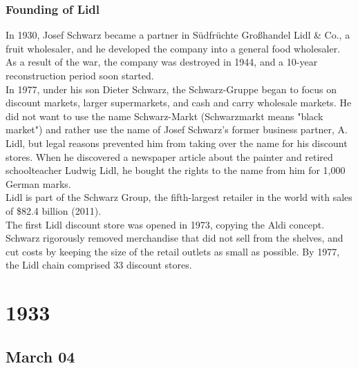 \documentclass[11pt]{report}
\begin{document}
\subsection{Founding of Lidl}
In 1930, Josef Schwarz became a partner in Südfrüchte Großhandel Lidl \& Co., a fruit wholesaler, and he developed the company into a general food wholesaler. As a result of the war, the company was destroyed in 1944, and a 10-year reconstruction period soon started.\\
\indent In 1977, under his son Dieter Schwarz, the Schwarz-Gruppe began to focus on discount markets, larger supermarkets, and cash and carry wholesale markets. He did not want to use the name Schwarz-Markt (Schwarzmarkt means "black market") and rather use the name of Josef Schwarz's former business partner, A. Lidl, but legal reasons prevented him from taking over the name for his discount stores. When he discovered a newspaper article about the painter and retired schoolteacher Ludwig Lidl, he bought the rights to the name from him for 1,000 German marks.\\
\indent Lidl is part of the Schwarz Group, the fifth-largest retailer in the world with sales of \$82.4 billion (2011).\\ \indent The first Lidl discount store was opened in 1973, copying the Aldi concept. Schwarz rigorously removed merchandise that did not sell from the shelves, and cut costs by keeping the size of the retail outlets as small as possible. By 1977, the Lidl chain comprised 33 discount stores.

\chapter{1933}
\section{March 04}
\end{document}
